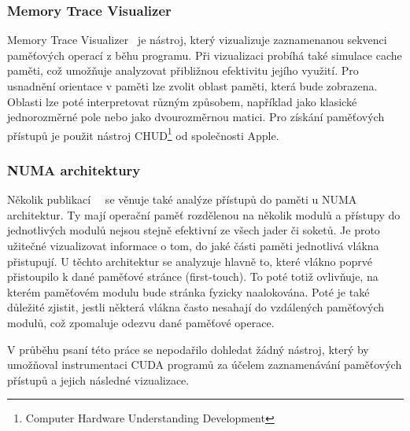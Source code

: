 \subsubsection*{Memory Trace Visualizer}
Memory Trace Visualizer~\cite{mtv} je nástroj, který vizualizuje zaznamenanou sekvenci paměťových operací z běhu programu. Při vizualizaci probíhá také simulace cache paměti, což umožňuje analyzovat přibližnou efektivitu jejího využití. Pro usnadnění orientace v paměti lze zvolit oblast paměti, která bude zobrazena. Oblasti lze poté interpretovat různým způsobem, například jako klasické jednorozměrné pole nebo jako dvourozměrnou matici. Pro získání paměťových přístupů je použit nástroj CHUD\footnote{Computer Hardware Understanding Development} od společnosti Apple.

\subsubsection*{NUMA architektury}
Několik publikací~\cite{numa-visualisation}~\cite{numa-tabarnac} se věnuje také analýze přístupů do paměti u NUMA architektur. Ty mají operační paměť rozdělenou na několik modulů a přístupy do jednotlivých modulů nejsou stejně efektivní ze všech jader či soketů. Je proto užitečné vizualizovat informace o tom, do jaké části paměti jednotlivá vlákna přistupují. U těchto architektur se analyzuje hlavně to, které vlákno poprvé přistoupilo k dané paměťové stránce (first-touch). To poté totiž ovlivňuje, na kterém paměťovém modulu bude stránka fyzicky naalokována. Poté je také důležité zjistit, jestli některá vlákna často nesahají do vzdálených paměťových modulů, což zpomaluje odezvu dané paměťové operace.

V průběhu psaní této práce se nepodařilo dohledat žádný nástroj, který by umožňoval instrumentaci CUDA programů za účelem zaznamenávání paměťových přístupů a jejich následné vizualizace.
